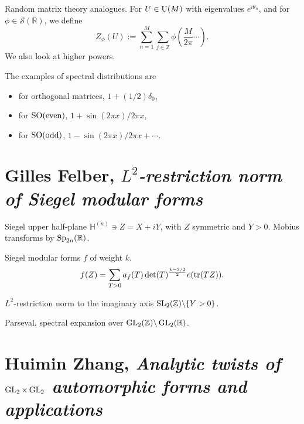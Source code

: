 \documentclass[reqno]{amsart} 
\begin{document}
Random matrix theory analogues.  For $U \in \operatorname{U}(M)$ with eigenvalues $e^{i \theta_n }$, and for $\phi \in \mathcal{S} (\mathbb{R})$, we define
\begin{equation*}
  Z_\phi (U) := \sum_{n = 1}^M \sum_{j \in \mathbb{Z} }
  \phi \left( \frac{M}{2 \pi }
    \dotsb
  \right).
\end{equation*}
We also look at higher powers.

The examples of spectral distributions are
\begin{itemize}
\item for orthogonal matrices, $1 + (1/2) \delta_0$,
\item for $\operatorname{SO}(\mathrm{even})$, $1 + \sin(2 \pi x) / 2 \pi x$,
\item for $\operatorname{SO}(\mathrm{odd})$, $1 - \sin (2 \pi x) / 2 \pi x + \dotsb$.
\end{itemize}




\section{Gilles Felber, \emph{$L^2$-restriction norm of Siegel modular forms}}
Siegel upper half-plane $\mathbb{H}^{(n)} \ni Z = X + i Y$, with $Z$ symmetric and $Y > 0$.  Mobius transforms by $\operatorname{Sp}_{2n}(\mathbb{R})$.

Siegel modular forms $f$ of weight $k$.
\begin{equation*}
f (Z) = \sum_{T > 0 } a_f (T) \det (T)^{\frac{k - 3/2}{2}} e (\operatorname{tr} (T Z)).
\end{equation*}

$L^2$-restriction norm to the imaginary axis $\operatorname{SL}_2(\mathbb{Z}) \backslash \{Y > 0\}$.

Parseval, spectral expansion over $\operatorname{GL}_2(\mathbb{Z}) \backslash \operatorname{GL}_2(\mathbb{R})$.

\section{Huimin Zhang, \emph{Analytic twists of $\operatorname{GL}_2 \times \operatorname{GL}_2$ automorphic forms and applications}}



{} 
\end{document}
